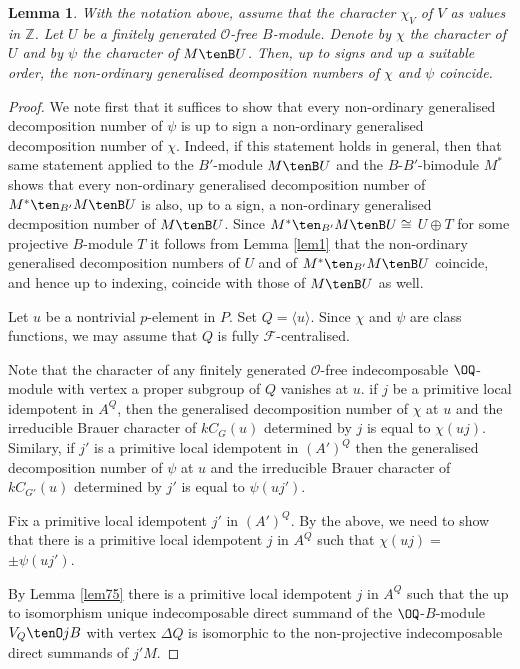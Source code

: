\documentclass{amsart} %
\theoremstyle{plain}\newtheorem{Theorem}{Theorem}[section]
\theoremstyle{plain}\newtheorem{Conjecture}[Theorem]{Conjecture}
\theoremstyle{plain}\newtheorem{Corollary}[Theorem]{Corollary}
\theoremstyle{plain}\newtheorem{Lemma}[Theorem]{Lemma}
\theoremstyle{plain}\newtheorem{Proposition}[Theorem]{Proposition}
\theoremstyle{definition}\newtheorem{Definition}[Theorem]{Definition}
\theoremstyle{definition}\newtheorem{Example}[Theorem]{Example}
\theoremstyle{definition}\newtheorem{Examples}[Theorem]{Examples}
\theoremstyle{definition}\newtheorem{Remark}[Theorem]{Remark}
\theoremstyle{definition}\newtheorem{Remarks}[Theorem]{Remarks}
\theoremstyle{plain}\newtheorem{Statement}[Theorem]{}
\def\CF{{\mathcal{F}}}    \def\OS{{\mathcal{O}S}}
\def\CO{{\mathcal{O}}}
\def\Z{{\mathbb Z}}
\begin{document}
\begin{Lemma} \label{lem8}
With the notation above, assume that the character $\chi_V$ of $V$ as values
in $\Z$. Let $U$ be a finitely generated $\CO$-free
$B$-module.  Denote by $\chi$ the character of $U$ and by $\psi$ the
character of $M\tenB U$. Then, up to signs and up a suitable order,
the non-ordinary generalised deomposition numbers of $\chi$ and
$\psi$ coincide.
\end{Lemma}

\begin{proof}
We note first that
it suffices to show that every non-ordinary generalised decomposition
number of $\psi$ is up to sign  a non-ordinary generalised  
decomposition
number of $\chi$. Indeed, if this statement holds in general, then 
that same statement applied to the $B'$-module $M\tenB U$ and 
the $B$-$B'$-bimodule $M^*$ shows 
that every non-ordinary generalised decomposition number of $M^*\ten_{B'} M\tenB U$ is
also, up to a sign, a non-ordinary generalised decmposition number of
$M\tenB U$. Since $M^*\ten_{B'} M\tenB U\cong$ $U\oplus T$ for some projective
$B$-module $T$ it follows from Lemma \ref{lem1} that  the non-ordinary
generalised decomposition numbers of $U$ and of $M^*\ten_{B'} M\tenB U$
coincide, and hence up to indexing, coincide with those of $M\tenB U$ as well.

Let $u$ be a nontrivial $p$-element in $P$. Set $Q=\langle u\rangle$.
Since $\chi$ and $\psi$ are class functions, we may assume that $Q$ is
fully $\CF$-centralised.

Note that the character of any finitely generated $\CO$-free indecomposable 
$\OQ$-module with vertex a proper subgroup of $Q$ vanishes at $u$.
if $j$ be a primitive local idempotent in $A^Q$, then the generalised 
decomposition number of $\chi$ at $u$ and the irreducible Brauer character of $kC_G(u)$ 
determined by $j$ is equal to $\chi(uj)$. Similary, if $j'$ is a primitive local
idempotent in $(A')^Q$ then the generalised decomposition number  of
$\psi$ at $u$ and the irreducible  Brauer character  of $kC_{G'}(u)$ determined
by $j'$ is equal to $\psi(uj')$. 

Fix a primitive local idempotent $j'$ in $(A')^Q$. By the above, we need to 
show that there is a primitive local idempotent $j$ in $A^Q$ such that
$\chi(uj)=$ $\pm\psi(uj')$.

By Lemma \ref{lem75}  there is a primitive local
idempotent $j$ in $A^Q$ such that  the up to isomorphism 
unique indecomposable direct summand of the $\OQ$-$B$-module 
$V_Q\tenO jB$ with vertex $\Delta Q$ is isomorphic to the non-projective 
indecomposable direct summands of $j'M$.


\end{proof}
\end{document}
